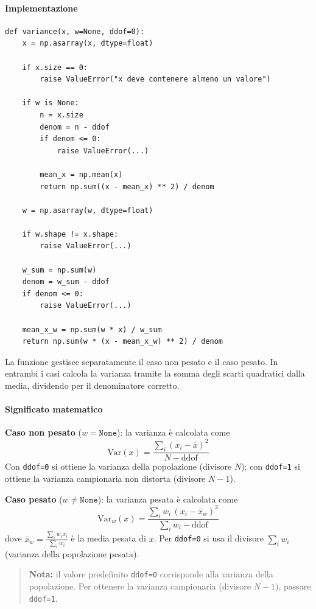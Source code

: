 \paragraph{Implementazione}
\begin{verbatim}
def variance(x, w=None, ddof=0):
    x = np.asarray(x, dtype=float)

    if x.size == 0:
        raise ValueError("x deve contenere almeno un valore")

    if w is None:
        n = x.size
        denom = n - ddof
        if denom <= 0:
            raise ValueError(...)

        mean_x = np.mean(x)
        return np.sum((x - mean_x) ** 2) / denom

    w = np.asarray(w, dtype=float)

    if w.shape != x.shape:
        raise ValueError(...)

    w_sum = np.sum(w)
    denom = w_sum - ddof
    if denom <= 0:
        raise ValueError(...)

    mean_x_w = np.sum(w * x) / w_sum
    return np.sum(w * (x - mean_x_w) ** 2) / denom
\end{verbatim}
La funzione gestisce separatamente il caso non pesato e il caso pesato. In entrambi
i casi calcola la varianza tramite la somma degli scarti quadratici dalla media,
dividendo per il denominatore corretto.

\paragraph{Significato matematico}
\textbf{Caso non pesato} ($w = \texttt{None}$): la varianza è calcolata come
$$\text{Var}(x) = \frac{\sum_i (x_i - \overline{x})^2}{N - \text{ddof}}$$
Con \texttt{ddof=0} si ottiene la varianza della popolazione (divisore $N$);
con \texttt{ddof=1} si ottiene la varianza campionaria non distorta (divisore $N-1$).

\textbf{Caso pesato} ($w \neq \texttt{None}$): la varianza pesata è calcolata come
$$\text{Var}_w(x) = \frac{\sum_i w_i \, (x_i - \bar{x}_w)^2}{\sum_i w_i - \text{ddof}}$$
dove $\bar{x}_w = \frac{\sum_i w_i x_i}{\sum_i w_i}$ è la media pesata di $x$.
Per \texttt{ddof=0} si usa il divisore $\sum_i w_i$ (varianza della popolazione pesata).

\begin{quote}
\textbf{Nota:} il valore predefinito \texttt{ddof=0} corrisponde alla varianza della
popolazione. Per ottenere la varianza campionaria (divisore $N-1$), passare
\texttt{ddof=1}.
\end{quote}

